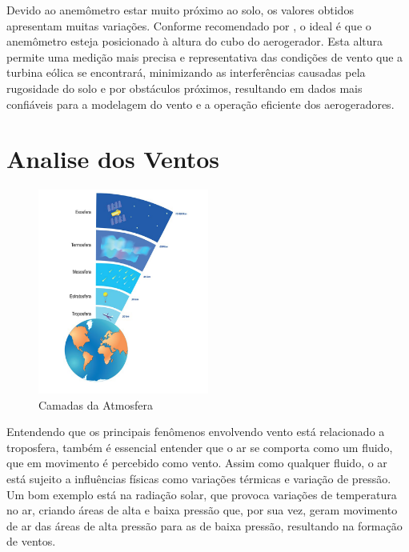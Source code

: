 \par Devido ao anemômetro estar muito próximo ao solo, os valores obtidos apresentam muitas variações. Conforme recomendado por , o ideal é que o anemômetro esteja posicionado à altura do cubo do aerogerador. Esta altura permite uma medição mais precisa e representativa das condições de vento que a turbina eólica se encontrará, minimizando as interferências causadas pela rugosidade do solo e por obstáculos próximos, resultando em dados mais confiáveis para a modelagem do vento e a operação eficiente dos aerogeradores.


\section{Analise dos Ventos}

\par
    
\begin{figure}[H]
    \caption{Camadas da Atmosfera}
    \label{fig:atmosfera}
    \centering
    \includegraphics[width=0.5\textwidth]{Figuras/Teorico/atmo.png}
\end{figure}

\par Entendendo que os principais fenômenos envolvendo vento está relacionado a troposfera, também é essencial entender que o ar se comporta como um fluido, que em movimento é percebido como vento. Assim como qualquer fluido, o ar está sujeito a influências físicas como variações térmicas e variação de pressão. Um bom exemplo está na radiação solar, que provoca variações de temperatura no ar, criando áreas de alta e baixa pressão que, por sua vez, geram movimento de ar das áreas de alta pressão para as de baixa pressão, resultando na formação de ventos.

